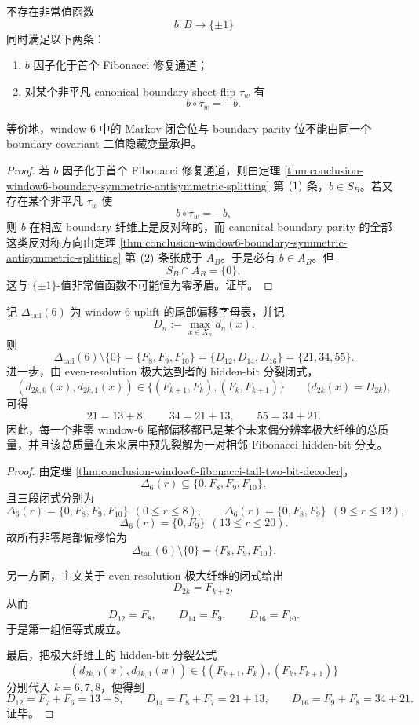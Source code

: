 \begin{corollary}\label{cor:conclusion-window6-markov-boundary-onebit-incompatibility}
不存在非常值函数
\[
b:B\to\{\pm1\}
\]
同时满足以下两条：
\begin{enumerate}
  \item \(b\) 因子化于首个 Fibonacci 修复通道；
  \item 对某个非平凡 canonical boundary sheet-flip \(\tau_w\) 有
  \[
  b\circ\tau_w=-b.
  \]
\end{enumerate}
等价地，window-\(6\) 中的 Markov 闭合位与 boundary parity 位不能由同一个 boundary-covariant 二值隐藏变量承担。
\end{corollary}
\begin{proof}
若 \(b\) 因子化于首个 Fibonacci 修复通道，则由定理 \ref{thm:conclusion-window6-boundary-symmetric-antisymmetric-splitting} 第 \(\textup{(1)}\) 条，\(b\in S_B\)。若又存在某个非平凡 \(\tau_w\) 使
\[
b\circ\tau_w=-b,
\]
则 \(b\) 在相应 boundary 纤维上是反对称的，而 canonical boundary parity 的全部这类反对称方向由定理 \ref{thm:conclusion-window6-boundary-symmetric-antisymmetric-splitting} 第 \(\textup{(2)}\) 条张成于 \(A_B\)。于是必有 \(b\in A_B\)。但
\[
S_B\cap A_B=\{0\},
\]
这与 \(\{\pm1\}\)-值非常值函数不可能恒为零矛盾。证毕。
\end{proof}

\begin{theorem}\label{thm:conclusion-window6-tail-alphabet-forward-maximal-spectrum}
记 \(\Delta_{\mathrm{tail}}(6)\) 为 window-\(6\) uplift 的尾部偏移字母表，并记
\[
D_n:=\max_{x\in X_n} d_n(x).
\]
则
\[
\Delta_{\mathrm{tail}}(6)\setminus\{0\}
=
\{F_8,F_9,F_{10}\}
=
\{D_{12},D_{14},D_{16}\}
=
\{21,34,55\}.
\]
进一步，由 even-resolution 极大达到者的 hidden-bit 分裂闭式，
\[
(d_{2k,0}(x),d_{2k,1}(x))
\in
\{(F_{k+1},F_k),(F_k,F_{k+1})\}
\qquad
\bigl(d_{2k}(x)=D_{2k}\bigr),
\]
可得
\[
21=13+8,\qquad
34=21+13,\qquad
55=34+21.
\]
因此，每一个非零 window-\(6\) 尾部偏移都已是某个未来偶分辨率极大纤维的总质量，并且该总质量在未来层中预先裂解为一对相邻 Fibonacci hidden-bit 分支。
\end{theorem}
\begin{proof}
由定理 \ref{thm:conclusion-window6-fibonacci-tail-two-bit-decoder}，
\[
\Delta_6(r)\subseteq \{0,F_8,F_9,F_{10}\},
\]
且三段闭式分别为
\[
\Delta_6(r)=\{0,F_8,F_9,F_{10}\}\ \ (0\le r\le 8),
\qquad
\Delta_6(r)=\{0,F_8,F_9\}\ \ (9\le r\le 12),
\]
\[
\Delta_6(r)=\{0,F_9\}\ \ (13\le r\le 20).
\]
故所有非零尾部偏移恰为
\[
\Delta_{\mathrm{tail}}(6)\setminus\{0\}=\{F_8,F_9,F_{10}\}.
\]

另一方面，主文关于 even-resolution 极大纤维的闭式给出
\[
D_{2k}=F_{k+2},
\]
从而
\[
D_{12}=F_8,\qquad D_{14}=F_9,\qquad D_{16}=F_{10}.
\]
于是第一组恒等式成立。

最后，把极大纤维上的 hidden-bit 分裂公式
\[
(d_{2k,0}(x),d_{2k,1}(x))
\in
\{(F_{k+1},F_k),(F_k,F_{k+1})\}
\]
分别代入 \(k=6,7,8\)，便得到
\[
D_{12}=F_7+F_6=13+8,
\qquad
D_{14}=F_8+F_7=21+13,
\qquad
D_{16}=F_9+F_8=34+21.
\]
证毕。
\end{proof}

